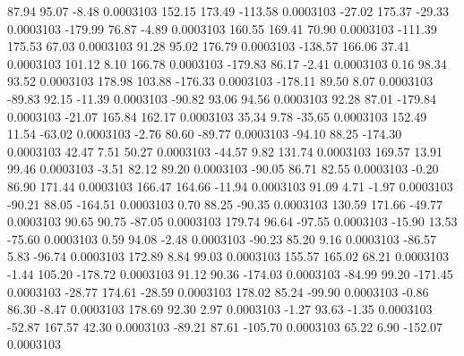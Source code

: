        87.94       95.07       -8.48     0.0003103
      152.15      173.49     -113.58     0.0003103
      -27.02      175.37      -29.33     0.0003103
     -179.99       76.87       -4.89     0.0003103
      160.55      169.41       70.90     0.0003103
     -111.39      175.53       67.03     0.0003103
       91.28       95.02      176.79     0.0003103
     -138.57      166.06       37.41     0.0003103
      101.12        8.10      166.78     0.0003103
     -179.83       86.17       -2.41     0.0003103
        0.16       98.34       93.52     0.0003103
      178.98      103.88     -176.33     0.0003103
     -178.11       89.50        8.07     0.0003103
      -89.83       92.15      -11.39     0.0003103
      -90.82       93.06       94.56     0.0003103
       92.28       87.01     -179.84     0.0003103
      -21.07      165.84      162.17     0.0003103
       35.34        9.78      -35.65     0.0003103
      152.49       11.54      -63.02     0.0003103
       -2.76       80.60      -89.77     0.0003103
      -94.10       88.25     -174.30     0.0003103
       42.47        7.51       50.27     0.0003103
      -44.57        9.82      131.74     0.0003103
      169.57       13.91       99.46     0.0003103
       -3.51       82.12       89.20     0.0003103
      -90.05       86.71       82.55     0.0003103
       -0.20       86.90      171.44     0.0003103
      166.47      164.66      -11.94     0.0003103
       91.09        4.71       -1.97     0.0003103
      -90.21       88.05     -164.51     0.0003103
        0.70       88.25      -90.35     0.0003103
      130.59      171.66      -49.77     0.0003103
       90.65       90.75      -87.05     0.0003103
      179.74       96.64      -97.55     0.0003103
      -15.90       13.53      -75.60     0.0003103
        0.59       94.08       -2.48     0.0003103
      -90.23       85.20        9.16     0.0003103
      -86.57        5.83      -96.74     0.0003103
      172.89        8.84       99.03     0.0003103
      155.57      165.02       68.21     0.0003103
       -1.44      105.20     -178.72     0.0003103
       91.12       90.36     -174.03     0.0003103
      -84.99       99.20     -171.45     0.0003103
      -28.77      174.61      -28.59     0.0003103
      178.02       85.24      -99.90     0.0003103
       -0.86       86.30       -8.47     0.0003103
      178.69       92.30        2.97     0.0003103
       -1.27       93.63       -1.35     0.0003103
      -52.87      167.57       42.30     0.0003103
      -89.21       87.61     -105.70     0.0003103
       65.22        6.90     -152.07     0.0003103
